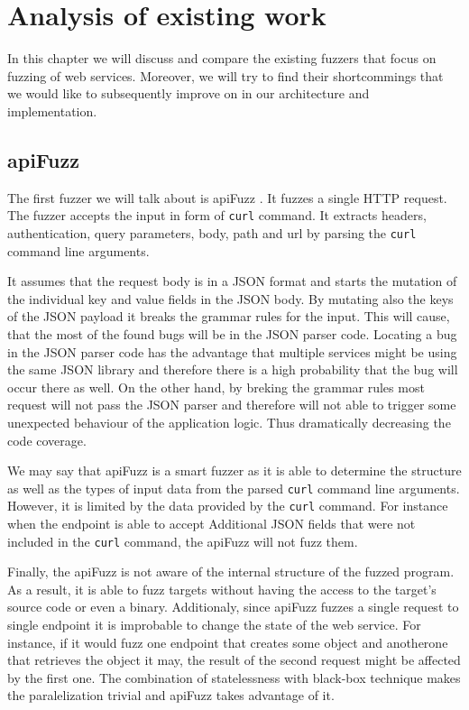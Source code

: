 \chapter{Analysis of existing work}
In this chapter we will discuss and compare the existing fuzzers that focus on fuzzing of web services. \label{sub:Types of fuzzers} Moreover, we will try to find their shortcommings that we would like to subsequently improve on in our architecture and implementation.

\section{apiFuzz}
The first fuzzer we will talk about is apiFuzz \cite{apiFuzz2020github}. It fuzzes a single HTTP request. The fuzzer accepts the input in form of \texttt{curl} command. It extracts headers, authentication, query parameters, body, path and url by parsing the \texttt{curl} command line arguments.

It assumes that the request body is in a JSON format and starts the mutation of the individual key and value fields in the JSON body. By mutating also the keys of the JSON payload it breaks the grammar rules for the input. This will cause, that the most of the found bugs will be in the JSON parser code. Locating a bug in the JSON parser code has the advantage that multiple services might be using the same JSON library and therefore there is a high probability that the bug will occur there as well. On the other hand, by breking the grammar rules most request will not pass the JSON parser and therefore will not able to trigger some unexpected behaviour of the application logic. Thus dramatically decreasing the code coverage.

We may say that apiFuzz is a smart fuzzer as it is able to determine the structure as well as the types of input data from the parsed \texttt{curl} command line arguments. However, it is limited by the data provided by the \texttt{curl} command. For instance when the endpoint is able to accept Additional JSON fields that were not included in the \texttt{curl} command, the apiFuzz will not fuzz them.

Finally, the apiFuzz is not aware of the internal structure of the fuzzed program. As a result, it is able to fuzz targets without having the access to the target's source code or even a binary. Additionaly, since apiFuzz fuzzes a single request to single endpoint it is improbable to change the state of the web service. For instance, if it would fuzz one endpoint that creates some object and anotherone that retrieves the object it may, the result of the second request might be affected by the first one. The combination of statelessness with black-box technique makes the paralelization trivial and apiFuzz takes advantage of it.

